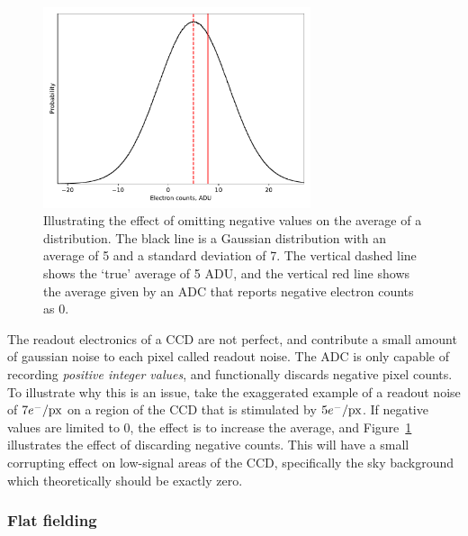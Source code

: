 \begin{figure}
    \centering
    \includegraphics[width=0.7\textwidth]{figures/observations/bias_frame_histogram.pdf}
    \caption{Illustrating the effect of omitting negative values on the average of a distribution. The black line is a Gaussian distribution with an average of 5 and a standard deviation of 7. The vertical dashed line shows the `true' average of 5 ADU, and the vertical red line shows the average given by an ADC that reports negative electron counts as 0.}
    \label{fig:observations:bias frame histogram}
\end{figure}
The readout electronics of a CCD are not perfect, and contribute a small amount of gaussian noise to each pixel called readout noise. The ADC is only capable of recording {\it positive integer values}, and functionally discards negative pixel counts. To illustrate why this is an issue, take the exaggerated example of a readout noise of $7 e^-/{\rm px}$ on a region of the CCD that is stimulated by $5 e^-/{\rm px}$. If negative values are limited to 0, the effect is to increase the average, and Figure~\ref{fig:observations:bias frame histogram} illustrates the effect of discarding negative counts.
This will have a small corrupting effect on low-signal areas of the CCD, specifically the sky background which theoretically should be exactly zero.


\subsubsection{Flat fielding}

